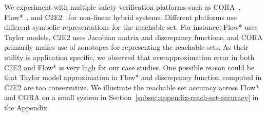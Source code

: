 We experiment with multiple safety verification platforms such as CORA~\cite{Althoff2018b}, Flow*~\cite{10.1007/978-3-642-39799-8_18}, and C2E2~\cite{Duggirala.2015} for non-linear hybrid systems. Different platforms use different symbolic representations for the reachable set. For instance, Flow* uses Taylor models, C2E2 uses Jacobian matrix and discrepancy functions, and CORA primarily makes use of zonotopes for representing the reachable sets. As their utility is application specific,  we observed that overapproximation error in both C2E2 and Flow* is very high for our case studies. One possible reason could be that Taylor model approximation in Flow* and discrepancy function computed in C2E2 are too conservative. We illustrate the  reachable set accuracy across Flow* and CORA on a small system in Section~\ref{subsec:appendix-reach-set-accuracy} in the Appendix.



%


